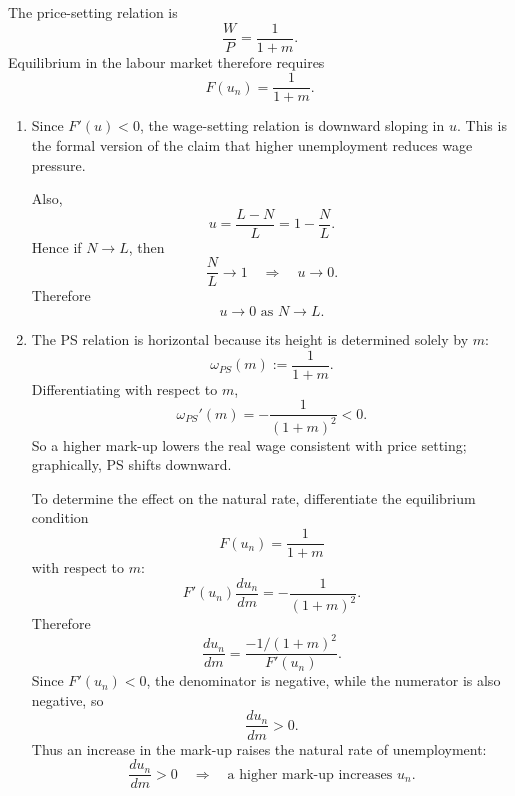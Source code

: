 \documentclass[12pt]{article}
\begin{document}
The price-setting relation is
\[
\frac{W}{P}=\frac{1}{1+m}.
\]
Equilibrium in the labour market therefore requires
\[
F(u_n)=\frac{1}{1+m}.
\]

\begin{enumerate}[label=(\alph*)]
    \item
    Since \(F'(u)<0\), the wage-setting relation is downward sloping in \(u\). This is the formal version of the claim that higher unemployment reduces wage pressure.

    Also,
    \[
    u=\frac{L-N}{L}=1-\frac{N}{L}.
    \]
    Hence if \(N\to L\), then
    \[
    \frac{N}{L}\to 1
    \quad\Longrightarrow\quad
    u\to 0.
    \]
    Therefore
    \[
    \boxed{u\to 0 \text{ as } N\to L.}
    \]

    \item
    The PS relation is horizontal because its height is determined solely by \(m\):
    \[
    \omega_{PS}(m):=\frac{1}{1+m}.
    \]
    Differentiating with respect to \(m\),
    \[
    \omega_{PS}'(m)=-\frac{1}{(1+m)^2}<0.
    \]
    So a higher mark-up lowers the real wage consistent with price setting; graphically, PS shifts downward.

    To determine the effect on the natural rate, differentiate the equilibrium condition
    \[
    F(u_n)=\frac{1}{1+m}
    \]
    with respect to \(m\):
    \[
    F'(u_n)\frac{du_n}{dm}=-\frac{1}{(1+m)^2}.
    \]
    Therefore
    \[
    \frac{du_n}{dm}
    =
    \frac{-1/(1+m)^2}{F'(u_n)}.
    \]
    Since \(F'(u_n)<0\), the denominator is negative, while the numerator is also negative, so
    \[
    \frac{du_n}{dm}>0.
    \]
    Thus an increase in the mark-up raises the natural rate of unemployment:
    \[
    \boxed{\frac{du_n}{dm}>0 \quad\Longrightarrow\quad \text{a higher mark-up increases }u_n.}
    \]
\end{enumerate}
\end{document}
